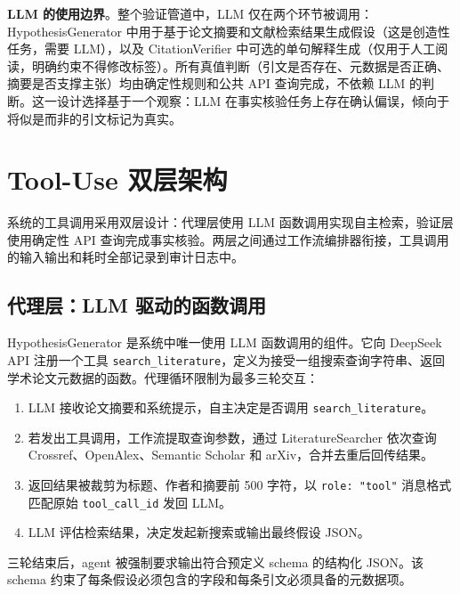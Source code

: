 \documentclass[11pt,a4paper]{ctexart}
\begin{document}
\textbf{LLM 的使用边界}。整个验证管道中，LLM 仅在两个环节被调用：HypothesisGenerator 中用于基于论文摘要和文献检索结果生成假设（这是创造性任务，需要 LLM），以及 CitationVerifier 中可选的单句解释生成（仅用于人工阅读，明确约束不得修改标签）。所有真值判断（引文是否存在、元数据是否正确、摘要是否支撑主张）均由确定性规则和公共 API 查询完成，不依赖 LLM 的判断。这一设计选择基于一个观察：LLM 在事实核验任务上存在确认偏误，倾向于将似是而非的引文标记为真实。

\section{Tool-Use 双层架构}

系统的工具调用采用双层设计：代理层使用 LLM 函数调用实现自主检索，验证层使用确定性 API 查询完成事实核验。两层之间通过工作流编排器衔接，工具调用的输入输出和耗时全部记录到审计日志中。

\subsection{代理层：LLM 驱动的函数调用}

HypothesisGenerator 是系统中唯一使用 LLM 函数调用的组件。它向 DeepSeek API 注册一个工具 \texttt{search\_literature}，定义为接受一组搜索查询字符串、返回学术论文元数据的函数。代理循环限制为最多三轮交互：

\begin{enumerate}[leftmargin=*,nosep]
  \item LLM 接收论文摘要和系统提示，自主决定是否调用 \texttt{search\_literature}。
  \item 若发出工具调用，工作流提取查询参数，通过 LiteratureSearcher 依次查询 Crossref、OpenAlex、Semantic Scholar 和 arXiv，合并去重后回传结果。
  \item 返回结果被裁剪为标题、作者和摘要前 500 字符，以 \texttt{role: "tool"} 消息格式匹配原始 \texttt{tool\_call\_id} 发回 LLM。
  \item LLM 评估检索结果，决定发起新搜索或输出最终假设 JSON。
\end{enumerate}

三轮结束后，agent 被强制要求输出符合预定义 schema 的结构化 JSON。该 schema 约束了每条假设必须包含的字段和每条引文必须具备的元数据项。
\end{document}
